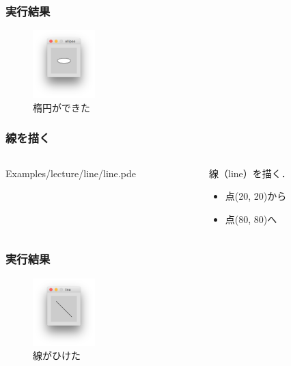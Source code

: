 \documentclass[dvipdfmx]{beamer}
\begin{document}
        \begin{frame}
            \frametitle{実行結果}
                \begin{figure}[htb]
                    \includegraphics[width=24mm]{images/03.png}
                    \caption{楕円ができた}
                    \label{fig:03}
                \end{figure}
        \end{frame}

        \begin{frame}
            \frametitle{線を描く}
            \begin{columns}[c]
                \begin{column}{0.50\textwidth}
                    \tiny
                    Examples/lecture/line/line.pde
                    \scriptsize
                \end{column}
                \begin{column}{0.50\textwidth}
                    \begin{block}{線（line）を描く．}
                        \begin{itemize}
                            \item 点(20, 20)から
                            \item 点(80, 80)へ
                        \end{itemize}
                    \end{block}
                \end{column}
            \end{columns}
        \end{frame}

        \begin{frame}
            \frametitle{実行結果}
                \begin{figure}[htb]
                    \includegraphics[width=24mm]{images/04.png}
                    \caption{線がひけた}
                    \label{fig:04}
                \end{figure}
        \end{frame}
\end{document}

